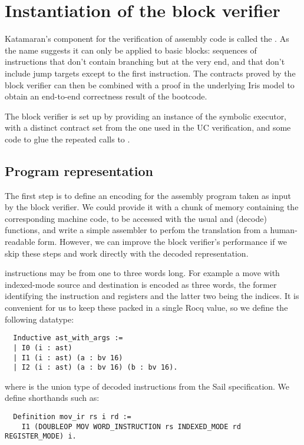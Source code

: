 \section{Instantiation of the block verifier}

Katamaran's component for the verification of assembly code is called the . As the name suggests it can only be applied to basic blocks: sequences of instructions that don't contain branching but at the very end, and that don't include jump targets except to the first instruction. The contracts proved by the block verifier can then be combined with a proof in the underlying Iris model to obtain an end-to-end correctness result of the bootcode.

The block verifier is set up by providing an instance of the symbolic executor,
with a distinct contract set from the one used in the UC verification, and some code to glue the repeated calls to .

\subsection{Program representation}
\label{sec:program-representation}

The first step is to define an encoding for the assembly program taken as input by the block verifier. We could provide it with a chunk of memory containing the corresponding machine code, to be accessed with the usual  and  (decode) functions, and write a simple assembler to perfom the translation from a human-readable form. However, we can improve the block verifier's performance if we skip these steps and work directly with the decoded representation.

\msp instructions may be from one to three words long. For example a move with indexed-mode source and destination is encoded as three words, the former identifying the instruction and registers and the latter two being the indices. It is convenient for us to keep these packed in a single Rocq value, so we define the following datatype:
\begin{verbatim}
  Inductive ast_with_args :=
  | I0 (i : ast)
  | I1 (i : ast) (a : bv 16)
  | I2 (i : ast) (a : bv 16) (b : bv 16).
\end{verbatim}
where  is the union type of decoded instructions from the Sail specification. We define shorthands such as:
\begin{verbatim}
  Definition mov_ir rs i rd :=
    I1 (DOUBLEOP MOV WORD_INSTRUCTION rs INDEXED_MODE rd REGISTER_MODE) i.
\end{verbatim}

